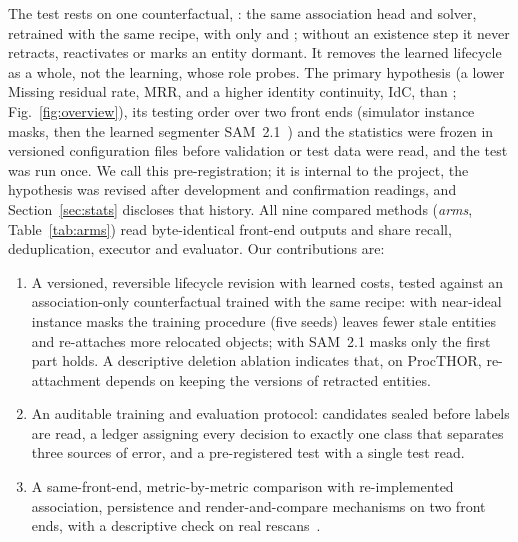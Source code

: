 The test rests on one counterfactual, : the same association head and solver, retrained with the same recipe, with only  and ; without an existence step it never retracts, reactivates or marks an entity dormant.
It removes the learned lifecycle as a whole, not the learning, whose role  probes.
The primary hypothesis (a lower Missing residual rate, MRR, and a higher identity continuity, IdC, than ; Fig.~\ref{fig:overview}), its testing order over two front ends (simulator instance masks, then the learned segmenter SAM~2.1~\cite{sam2_2025}) and the statistics were frozen in versioned configuration files before validation or test data were read, and the test was run once.
We call this pre-registration; it is internal to the project, the hypothesis was revised after development and confirmation readings, and Section~\ref{sec:stats} discloses that history.
All nine compared methods (\emph{arms}, Table~\ref{tab:arms}) read byte-identical front-end outputs and share recall, deduplication, executor and evaluator.
Our contributions are:
\begin{enumerate}
\item A versioned, reversible lifecycle revision with learned costs, tested against an association-only counterfactual trained with the same recipe: with near-ideal instance masks the training procedure (five seeds) leaves fewer stale entities and re-attaches more relocated objects; with SAM~2.1 masks only the first part holds. A descriptive deletion ablation indicates that, on ProcTHOR, re-attachment depends on keeping the versions of retracted entities.
\item An auditable training and evaluation protocol: candidates sealed before labels are read, a ledger assigning every decision to exactly one class that separates three sources of error, and a pre-registered test with a single test read.
\item A same-front-end, metric-by-metric comparison with re-implemented association, persistence and render-and-compare mechanisms on two front ends, with a descriptive check on real rescans~\cite{rio2019}.
\end{enumerate}

